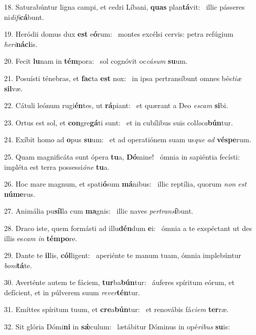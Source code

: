18. Saturabúntur ligna campi, et cedri Líbani, \textbf{quas} plan\textbf{tá}vit: \ast\  illic pásseres ni\textit{di}\textit{fi}\textbf{cá}bunt.\

19. Heródii domus dux \textbf{est} e\textbf{ó}rum: \ast\  montes excélsi cervis: petra refúgium \textit{he}\textit{ri}\textbf{ná}\textbf{ci}is.\

20. Fecit \textbf{lu}nam in \textbf{tém}pora: \ast\  sol cognóvit oc\textit{cá}\textit{sum} \textbf{su}um.\

21. Posuísti ténebras, et \textbf{fac}ta \textbf{est} nox: \ast\  in ipsa pertransíbunt omnes bés\textit{ti}\textit{æ} \textbf{sil}væ.\

22. Cátuli leónum rugi\textbf{én}tes, ut \textbf{rá}piant: \ast\  et quærant a Deo \textit{es}\textit{cam} \textbf{si}bi.\

23. Ortus est sol, et \textbf{con}gre\textbf{gá}ti sunt: \ast\  et in cubílibus suis col\textit{lo}\textit{ca}\textbf{bún}tur.\

24. Exíbit homo ad \textbf{o}pus \textbf{su}um: \ast\  et ad operatiónem suam us\textit{que} \textit{ad} \textbf{vés}\textbf{pe}rum.\

25. Quam magnificáta sunt ópera \textbf{tu}a, \textbf{Dó}mine! \ast\  ómnia in sapiéntia fecísti: impléta est terra possessi\textit{ó}\textit{ne} \textbf{tu}a.\

26. Hoc mare magnum, et spati\textbf{ó}sum \textbf{má}nibus: \ast\  illic reptília, quorum \textit{non} \textit{est} \textbf{nú}\textbf{me}rus.\

27. Animália pu\textbf{síl}la cum \textbf{ma}gnis: \ast\  illic naves \textit{per}\textit{trans}\textbf{í}bunt.\

28. Draco iste, quem formásti ad illu\textbf{dén}dum \textbf{e}i: \ast\  ómnia a te exspéctant ut des illis es\textit{cam} \textit{in} \textbf{tém}\textbf{po}re.\

29. Dante te \textbf{il}lis, \textbf{cól}ligent: \ast\  aperiénte te manum tuam, ómnia implebúntur \textit{bo}\textit{ni}\textbf{tá}te.\

30. Averténte autem te fáciem, \textbf{tur}ba\textbf{bún}tur: \ast\  áuferes spíritum eórum, et defícient, et in púlverem suum \textit{re}\textit{ver}\textbf{tén}tur.\

31. Emíttes spíritum tuum, et \textbf{cre}a\textbf{bún}tur: \ast\  et renovábis fá\textit{ci}\textit{em} \textbf{ter}ræ.\

32. Sit glória Dómi\textbf{ni} in \textbf{sǽ}culum: \ast\  lætábitur Dóminus in opé\textit{ri}\textit{bus} \textbf{su}is:\

